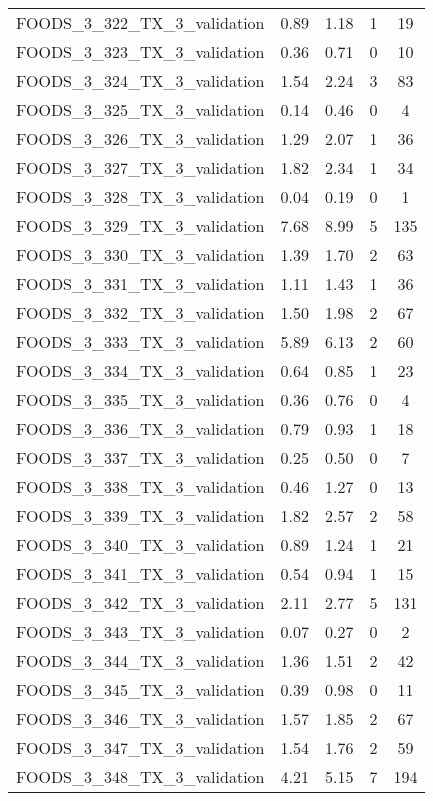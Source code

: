 \begin{table}
\begin{tabular}{|l|c|c|c|c|}
FOODS\_3\_322\_TX\_3\_validation & 0.89 & 1.18 & 1 & 19 \\
FOODS\_3\_323\_TX\_3\_validation & 0.36 & 0.71 & 0 & 10 \\
FOODS\_3\_324\_TX\_3\_validation & 1.54 & 2.24 & 3 & 83 \\
FOODS\_3\_325\_TX\_3\_validation & 0.14 & 0.46 & 0 & 4 \\
FOODS\_3\_326\_TX\_3\_validation & 1.29 & 2.07 & 1 & 36 \\
FOODS\_3\_327\_TX\_3\_validation & 1.82 & 2.34 & 1 & 34 \\
FOODS\_3\_328\_TX\_3\_validation & 0.04 & 0.19 & 0 & 1 \\
FOODS\_3\_329\_TX\_3\_validation & 7.68 & 8.99 & 5 & 135 \\
FOODS\_3\_330\_TX\_3\_validation & 1.39 & 1.70 & 2 & 63 \\
FOODS\_3\_331\_TX\_3\_validation & 1.11 & 1.43 & 1 & 36 \\
FOODS\_3\_332\_TX\_3\_validation & 1.50 & 1.98 & 2 & 67 \\
FOODS\_3\_333\_TX\_3\_validation & 5.89 & 6.13 & 2 & 60 \\
FOODS\_3\_334\_TX\_3\_validation & 0.64 & 0.85 & 1 & 23 \\
FOODS\_3\_335\_TX\_3\_validation & 0.36 & 0.76 & 0 & 4 \\
FOODS\_3\_336\_TX\_3\_validation & 0.79 & 0.93 & 1 & 18 \\
FOODS\_3\_337\_TX\_3\_validation & 0.25 & 0.50 & 0 & 7 \\
FOODS\_3\_338\_TX\_3\_validation & 0.46 & 1.27 & 0 & 13 \\
FOODS\_3\_339\_TX\_3\_validation & 1.82 & 2.57 & 2 & 58 \\
FOODS\_3\_340\_TX\_3\_validation & 0.89 & 1.24 & 1 & 21 \\
FOODS\_3\_341\_TX\_3\_validation & 0.54 & 0.94 & 1 & 15 \\
FOODS\_3\_342\_TX\_3\_validation & 2.11 & 2.77 & 5 & 131 \\
FOODS\_3\_343\_TX\_3\_validation & 0.07 & 0.27 & 0 & 2 \\
FOODS\_3\_344\_TX\_3\_validation & 1.36 & 1.51 & 2 & 42 \\
FOODS\_3\_345\_TX\_3\_validation & 0.39 & 0.98 & 0 & 11 \\
FOODS\_3\_346\_TX\_3\_validation & 1.57 & 1.85 & 2 & 67 \\
FOODS\_3\_347\_TX\_3\_validation & 1.54 & 1.76 & 2 & 59 \\
FOODS\_3\_348\_TX\_3\_validation & 4.21 & 5.15 & 7 & 194 \\

\end{tabular}
\end{table}
